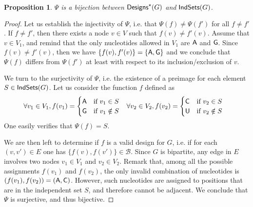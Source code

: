 \documentclass{bioinfo}
\newtheorem{proposition}[theorem]{Proposition}
\newcommand{\B}{\mathcal{B}}
\newcommand{\Design}[1]{{\sf Designs}^{\star}(#1)}
\newcommand{\IS}[1]{{\sf IndSets}(#1)}
\newcommand{\Nuc}[1]{{\sf #1}}
\newcommand{\Ab}{\Nuc{A}}
\newcommand{\Cb}{\Nuc{C}}
\newcommand{\Gb}{\Nuc{G}}
\newcommand{\Ub}{\Nuc{U}}
\begin{document}
\begin{proposition}
 $\Psi$ is a bijection between $\Design{G}$ and $\IS{G}$.
\end{proposition}
\begin{proof}
Let us establish the injectivity of  $\Psi$, i.e. that $\Psi(f)\neq\Psi(f')$ for all $f\neq f'$.
If $f\neq f'$, then there exists a node $v\in V$ such that $f(v)\neq f'(v)$. 
Assume that $v\in V_1$, and remind that the only nucleotides allowed in $V_1$ are $\Ab$ and $\Gb$. Since $f(v)\neq f'(v)$, then we have $\{f(v),f'(v)\}=\{\Ab,\Gb\}$
and we conclude that $\Psi(f)$ differs from $\Psi(f')$ at least with respect to its inclusion/exclusion of $v$.

We turn to the surjectivity of $\Psi$, i.e. the existence of a preimage for each element $S\in \IS{G}$. Let us consider the function $f$ defined as
\begin{align}
 \forall v_1\in V_1, f(v_1)&= \begin{cases} \Ab & \text{if }v_1\in S\\ \Gb & \text{if }v_1\notin S\end{cases}& 
 \forall v_2\in V_2, f(v_2)&= \begin{cases} \Cb & \text{if }v_2\in S\\ \Ub & \text{if }v_2\notin S\end{cases}
\end{align}
One easily verifies that $\Psi(f) = S$. 

We are then left to determine if $f$ is a valid design for $G$, i.e. if for each $(v, v') \in E$ one has  $\{f(v),f(v')\}\in \B.$ Since $G$ is bipartite, any edge in $E$ involves two nodes $v_1\in V_1$ and $v_2\in V_2$. Remark that, among all the possible assignments $f(v_1)$ and $f(v_2)$, the only invalid combination of nucleotides is $(f(v_1),f(v_2)) = (\Ab,\Cb)$. However, such nucleotides are assigned to positions that are in the independent set $S$, and therefore cannot be adjacent. We conclude that $\Psi$ is surjective, and thus bijective.
\end{proof}
\end{document}
